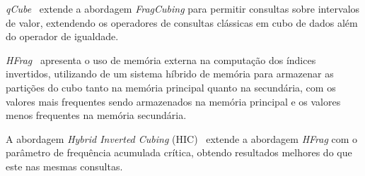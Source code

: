\textit{qCube}~\cite{silvaQCubeEfficientIntegration2013} extende a abordagem \textit{FragCubing} para permitir consultas sobre intervalos de valor, extendendo os operadores de consultas clássicas em cubo de dados além do operador de igualdade.

\textit{HFrag}~\cite{silvaHybridMemoryData2015} apresenta o uso de memória externa na computação dos índices invertidos, utilizando de um sistema híbrido de memória para armazenar as partições do cubo tanto na memória principal quanto na secundária, com os valores mais frequentes sendo armazenados na memória principal e os valores menos frequentes na memória secundária.

A abordagem \textit{Hybrid Inverted Cubing} (HIC)~\cite{silvaComputingBIGData2016} extende a abordagem \textit{HFrag} com o parâmetro de frequência acumulada crítica, obtendo resultados melhores do que este nas mesmas consultas.

